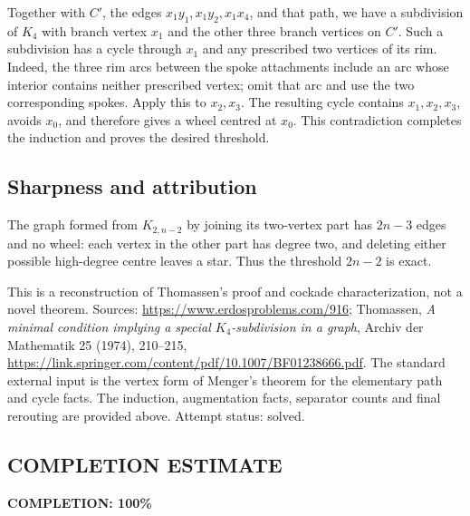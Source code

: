 Together with \(C'\), the edges \(x_1y_1,x_1y_2,x_1x_4\), and that path, we have a subdivision of \(K_4\) with branch vertex \(x_1\) and the other three branch vertices on \(C'\).
Such a subdivision has a cycle through \(x_1\) and any prescribed two vertices of its rim.
Indeed, the three rim arcs between the spoke attachments include an arc whose interior contains neither prescribed vertex; omit that arc and use the two corresponding spokes.
Apply this to \(x_2,x_3\).
The resulting cycle contains \(x_1,x_2,x_3\), avoids \(x_0\), and therefore gives a wheel centred at \(x_0\).
This contradiction completes the induction and proves the desired threshold.

\subsection*{Sharpness and attribution}
The graph formed from \(K_{2,n-2}\) by joining its two-vertex part has \(2n-3\) edges and no wheel:
each vertex in the other part has degree two, and deleting either possible high-degree centre leaves a star.
Thus the threshold \(2n-2\) is exact.

This is a reconstruction of Thomassen's proof and cockade characterization, not a novel theorem.
Sources: \url{https://www.erdosproblems.com/916};
Thomassen, \emph{A minimal condition implying a special \(K_4\)-subdivision in a graph}, Archiv der Mathematik 25 (1974), 210--215,
\url{https://link.springer.com/content/pdf/10.1007/BF01238666.pdf}.
The standard external input is the vertex form of Menger's theorem for the elementary path and cycle facts. The induction, augmentation facts, separator counts and final rerouting are provided above. Attempt status: solved.
\subsection*{COMPLETION ESTIMATE}
\textbf{COMPLETION: 100\%}
